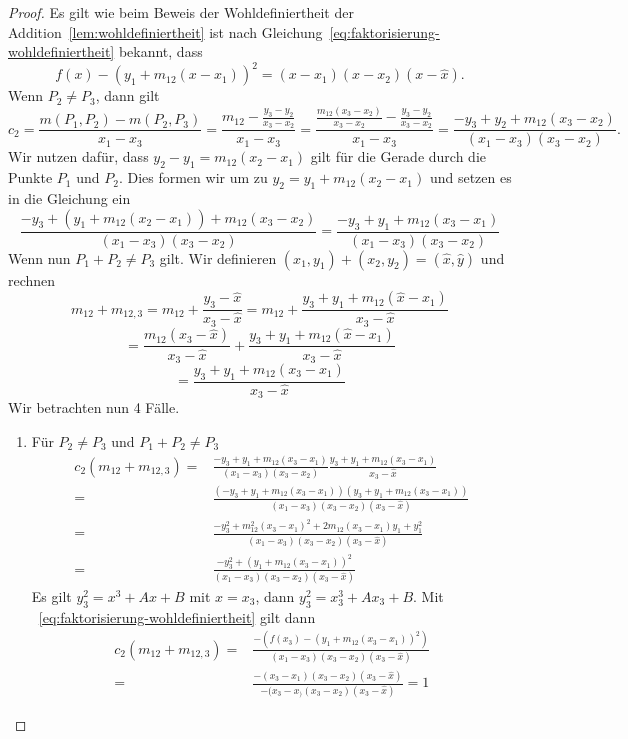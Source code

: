 \begin{proof}
    Es gilt wie beim Beweis der Wohldefiniertheit der Addition~\ref{lem:wohldefiniertheit}
    ist nach Gleichung~\eqref{eq:faktorisierung-wohldefiniertheit} bekannt, dass
    \[
        f(x)-\left(y_1+m_{12}(x-x_1)\right)^2
        =(x-x_1)(x-x_2)(x-\hat{x}).
    \]
    Wenn $P_2\neq P_3$, dann gilt
    \[
        c_2=\frac{m(P_1,P_2)-m(P_2,P_3)}{x_1-x_3}=\frac{m_{12}-\frac{y_3-y_2}{x_3-x_2}}{x_1-x_3}=\frac{\frac{m_{12}(x_3-x_2)}{x_3-x_2}-\frac{y_3-y_2}{x_3-x_2}}{x_1-x_3}
        = \frac{-y_3+y_2+m_{12}(x_3-x_2)}{(x_1-x_3)(x_3-x_2)}.
    \]
    Wir nutzen dafür, dass $y_2-y_1=m_{12}(x_2-x_1)$ gilt für die Gerade durch die Punkte $P_1$ und $P_2$. Dies formen wir um zu $y_2=y_1+m_{12}(x_2-x_1)$ und setzen es in die Gleichung ein
    \[
        \frac{-y_3+(y_1+m_{12}(x_2-x_1))+m_{12}(x_3-x_2)}{(x_1-x_3)(x_3-x_2)}
        = \frac{-y_3+y_1+m_{12}(x_3-x_1)}{(x_1-x_3)(x_3-x_2)}
    \]
    Wenn nun $P_1+P_2\neq P_3$ gilt. Wir definieren $(x_1,y_1) + (x_2,y_2) = (\hat{x},\hat{y})$ und rechnen
    \[
        m_{12}+m_{12,3}=m_{12}+\frac{y_3-\hat{x}}{x_3-\hat{x}}=m_{12}+\frac{y_3+y_1+m_{12}(\hat{x}-x_1)}{x_3-\hat{x}}
    \]
    \[
        =\frac{m_{12}(x_3-\hat{x})}{x_3-\hat{x}}+\frac{y_3+y_1+m_{12}(\hat{x}-x_1)}{x_3-\hat{x}}
    \]
    \[
        =\frac{y_3+y_1+m_{12}(x_3-x_1)}{x_3-\hat{x}}
    \]
    Wir betrachten nun 4 Fälle.
    \begin{enumerate}
        \item Für $P_2\neq P_3$ und $P_1+P_2\neq P_3$
              \begin{align*}
                  c_2(m_{12}+m_{12,3}) = & \frac{-y_3+y_1+m_{12}(x_3-x_1)}{(x_1-x_3)(x_3-x_2)} \frac{y_3+y_1+m_{12}(x_3-x_1)}{x_3-\hat{x}} \\
                  =                      & \frac{(-y_3+y_1+m_{12}(x_3-x_1))(y_3+y_1+m_{12}(x_3-x_1))}{(x_1-x_3)(x_3-x_2)(x_3-\hat{x})}     \\
                  =                      & \frac{-y_3^2+m_{12}^2(x_3-x_1)^2+2 m_{12}(x_3-x_1)y_1+ y_1^2}{(x_1-x_3)(x_3-x_2)(x_3-\hat{x})}  \\
                  =                      & \frac{-y_3^2+(y_1+ m_{12}(x_3-x_1))^2}{(x_1-x_3)(x_3-x_2)(x_3-\hat{x})}
              \end{align*}
              Es gilt $y_3^2=x^3+Ax+B$ mit $x=x_3$, dann $y_3^2=x_3^3+Ax_3+B$. Mit ~\eqref{eq:faktorisierung-wohldefiniertheit} gilt dann
              \begin{align*}
                  c_2(m_{12}+m_{12,3})= & \frac{-(f(x_3)-(y_1+m_{12}(x_3-x_1))^2)}{(x_1-x_3)(x_3-x_2)(x_3-\hat{x})}   \\
                  =                     & \frac{-(x_3-x_1)(x_3-x_2)(x_3-\hat{x})}{-(x_3-x_)(x_3-x_2)(x_3-\hat{x})}= 1
              \end{align*}


\end{enumerate}
\end{proof}
